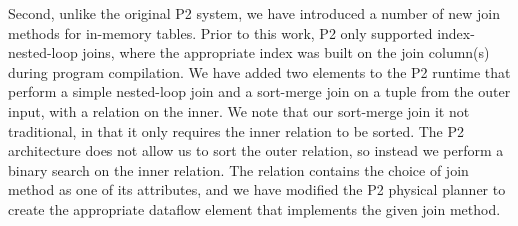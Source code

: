 Second, unlike the original P2 system, we have introduced a number of new join
methods for in-memory tables.  Prior to this work, P2 only supported
index-nested-loop joins, where the appropriate index was built on the join
column(s) during program compilation.  We have added two elements to the P2
runtime that perform a simple nested-loop join and a sort-merge join on a tuple
from the outer input, with a relation on the inner.  We note that our
sort-merge join it not traditional, in that it only requires the inner relation
to be sorted.  The P2 architecture does not allow us to sort the outer
relation, so instead we perform a binary search on the inner relation.  The
 relation contains the choice of join method as one of its
attributes, and we have modified the P2 physical planner to create the
appropriate dataflow element that implements the given join method.



